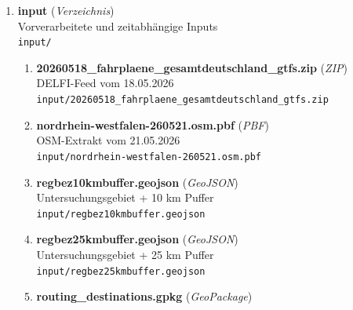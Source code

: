 


\begin{enumerate}[label=A\arabic*, ref=A\arabic*, leftmargin=*, itemsep=0.5em, topsep=0.3em]
\item \textbf{input} \textnormal{(\textit{Verzeichnis})}\\
Vorverarbeitete und zeitabhängige Inputs\\
\texttt{\small input/}
\edef\appendixlabelkey{app:A\arabic{enumi}}
\expandafter\label\expandafter{\appendixlabelkey}
\begin{enumerate}[label=A\arabic{enumi}-\arabic*, ref=A\arabic{enumi}-\arabic*, leftmargin=*, itemsep=0.5em, topsep=0.3em]
\item \textbf{20260518\_fahrplaene\_gesamtdeutschland\_gtfs.zip} \textnormal{(\textit{ZIP})}\\
DELFI-Feed vom 18.05.2026\\
\texttt{\small input/20260518\_fahrplaene\_gesamtdeutschland\_gtfs.zip}
\edef\appendixlabelkey{app:A\arabic{enumi}-\arabic{enumii}}
\expandafter\label\expandafter{\appendixlabelkey}
\item \textbf{nordrhein-westfalen-260521.osm.pbf} \textnormal{(\textit{PBF})}\\
OSM-Extrakt vom 21.05.2026\\
\texttt{\small input/nordrhein-westfalen-260521.osm.pbf}
\edef\appendixlabelkey{app:A\arabic{enumi}-\arabic{enumii}}
\expandafter\label\expandafter{\appendixlabelkey}
\item \textbf{regbez10kmbuffer.geojson} \textnormal{(\textit{GeoJSON})}\\
Untersuchungsgebiet + 10 km Puffer\\
\texttt{\small input/regbez10kmbuffer.geojson}
\edef\appendixlabelkey{app:A\arabic{enumi}-\arabic{enumii}}
\expandafter\label\expandafter{\appendixlabelkey}
\item \textbf{regbez25kmbuffer.geojson} \textnormal{(\textit{GeoJSON})}\\
Untersuchungsgebiet + 25 km Puffer\\
\texttt{\small input/regbez25kmbuffer.geojson}
\edef\appendixlabelkey{app:A\arabic{enumi}-\arabic{enumii}}
\expandafter\label\expandafter{\appendixlabelkey}
\item \textbf{routing\_destinations.gpkg} \textnormal{(\textit{GeoPackage})}\\

\end{enumerate}
\end{enumerate}

